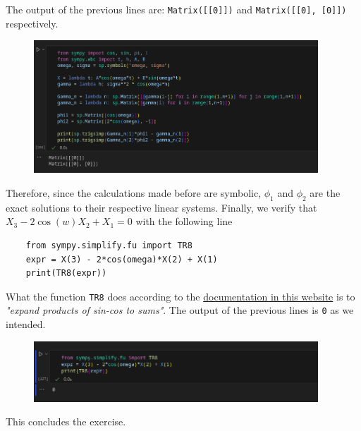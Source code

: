 The output of the previous lines are: \texttt{Matrix([[0]])} and \texttt{Matrix([[0], [0]])} respectively.

\begin{figure}[H]
    \centering
    \includegraphics[width=0.95\textwidth]{../pictures/hw2ex2.6.1.png}
\end{figure}

Therefore, since the calculations made before are symbolic, $\phi_1$ and $\phi_2$ are the exact solutions to their respective linear systems. Finally, we verify that $X_3 - 2 \cos(w) X_2 + X_1 = 0$ with the following line
\begin{verbatim}
    from sympy.simplify.fu import TR8
    expr = X(3) - 2*cos(omega)*X(2) + X(1)
    print(TR8(expr))
\end{verbatim}
What the function \texttt{TR8} does according to the \href{https://docs.sympy.org/latest/modules/simplify/fu.html}{documentation in this website} is to \textit{"expand products of sin-cos to sums"}. The output of the previous lines is \texttt{0} as we intended.

\begin{figure}[H]
    \centering
    \includegraphics[width=0.95\textwidth]{../pictures/hw2ex2.6.2.png}
\end{figure}

This concludes the exercise.